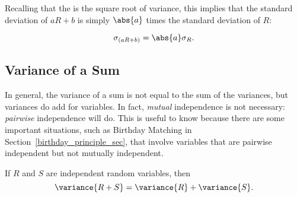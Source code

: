 Recalling that the  is the square root of
variance, this implies that the standard deviation of $a R + b$ is simply
$\abs{a}$ times the standard deviation of $R$:
\begin{corollary}
\[
\sigma_{(aR+b)} = \abs{a}\sigma_{R}.
\]
\end{corollary}


\subsection{Variance of a Sum}

In general, the variance of a sum is not equal to the sum of the
variances, but variances do add for \emph{}
variables.  In fact,  \emph{mutual}
independence is not necessary: 
\emph{pairwise} independence will do.  This is useful to know because
there are some important situations, such as Birthday Matching in
Section~\ref{birthday_principle_sec}, that involve variables that are
pairwise independent but not mutually independent.

\begin{theorem}\label{indvar}
If $R$ and $S$ are independent random variables, then
\begin{equation}\label{vR+R}
\variance{R + S} = \variance{R} + \variance{S}.
\end{equation}
\end{theorem}

